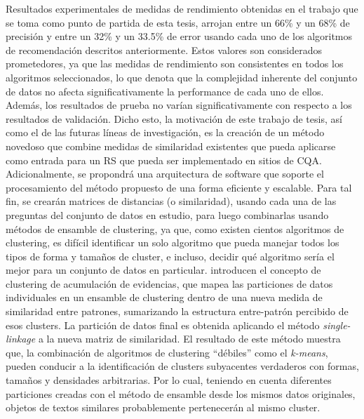 \bigskip Resultados experimentales de medidas de rendimiento obtenidas en el trabajo que se toma como punto de partida de esta tesis, arrojan entre un 66\% y un 68\% de precisión y entre un 32\% y un 33.5\% de error usando cada uno de los algoritmos de recomendación descritos anteriormente. Estos valores son considerados prometedores, ya que las medidas de rendimiento son consistentes en todos los algoritmos seleccionados, lo que denota que la complejidad inherente del conjunto de datos no afecta significativamente la performance de cada uno de ellos. Además, los resultados de prueba no varían significativamente con respecto a los resultados de validación. Dicho esto, la motivación de este trabajo de tesis, así como el de las futuras líneas de investigación, es la creación de un método novedoso que combine medidas de similaridad existentes que pueda aplicarse como entrada para un RS que pueda ser implementado en sitios de CQA. Adicionalmente, se propondrá una arquitectura de software que soporte el procesamiento del método propuesto de una forma eficiente y escalable. Para tal fin, se crearán matrices de distancias (o similaridad), usando cada una de las preguntas del conjunto de datos en estudio, para luego combinarlas usando métodos de ensamble de clustering, ya que, como existen cientos algoritmos de clustering, es difícil identificar un solo algoritmo que pueda manejar todos los tipos de forma y tamaños de cluster, e incluso, decidir qué algoritmo sería el mejor para un conjunto de datos en particular. \cite{fred2005combining} introducen el concepto de clustering de acumulación de evidencias, que mapea las particiones de datos individuales en un ensamble de clustering dentro de una nueva medida de similaridad entre patrones, sumarizando la estructura entre-patrón percibido de esos clusters. La partición de datos final es obtenida aplicando el método \textit{single-linkage} a la nueva matriz de similaridad. El resultado de este método muestra que, la combinación de algoritmos de clustering “débiles” como el \textit{k-means}, pueden conducir a la identificación de clusters subyacentes verdaderos con formas, tamaños y densidades arbitrarias. Por lo cual, teniendo en cuenta diferentes particiones creadas con el método de ensamble desde los mismos datos originales, objetos de textos similares probablemente pertenecerán al mismo cluster.

